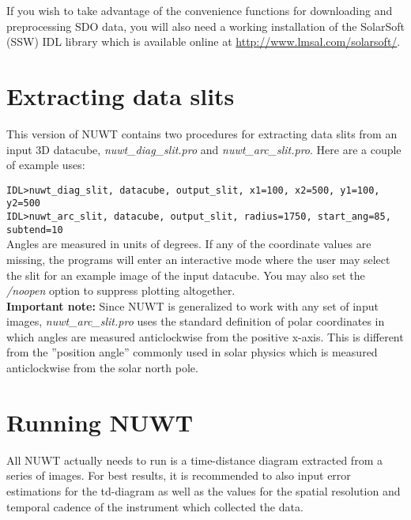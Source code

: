 \documentclass{article}
\begin{document}
If you wish to take advantage of the convenience functions for downloading and preprocessing SDO data, you will also need a working installation of the SolarSoft (SSW) IDL library which is available online at \url{http://www.lmsal.com/solarsoft/}. 


\section{Extracting data slits}
This version of NUWT contains two procedures for extracting data slits from an input 3D datacube, \textit{nuwt\_diag\_slit.pro} and \textit{nuwt\_arc\_slit.pro}. Here are a couple of example uses:\newline

\hspace{0.5cm} \texttt{IDL\textgreater nuwt\_diag\_slit, datacube, output\_slit, x1=100, x2=500, y1=100, y2=500} \\ 
\hspace{0.5cm} \texttt{IDL\textgreater nuwt\_arc\_slit, datacube, output\_slit, radius=1750, start\_ang=85, subtend=10} \\

Angles are measured in units of degrees. If any of the coordinate values are missing, the programs will enter an interactive mode where the user may select the slit for an example image of the input datacube. You may also set the \textit{/noopen} option to suppress plotting altogether. \\ 

\textbf{Important note:} Since NUWT is generalized to work with any set of input images, \textit{nuwt\_arc\_slit.pro} uses the standard definition of polar coordinates in which angles are measured anticlockwise from the positive x-axis. This is different from the ''position angle'' commonly used in solar physics which is measured anticlockwise from the solar north pole.


\section{Running NUWT}
All NUWT actually needs to run is a time-distance diagram extracted from a series of images. For best results, it is recommended to also input error estimations for the td-diagram as well as the values for the spatial resolution and temporal cadence of the instrument which collected the data. \\
\end{document}
